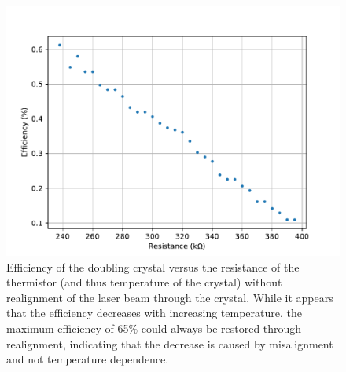 \begin{figure}[h!]
  \centering
  \includegraphics[width = .8\textwidth]{Images/efficiency.pdf}
  \caption{Efficiency of the doubling crystal versus the resistance of the thermistor (and thus temperature of the crystal) without realignment of the laser beam through the crystal. While it appears that the efficiency decreases with increasing temperature, the maximum efficiency of 65\% could always be restored through realignment, indicating that the decrease is caused by misalignment and not temperature dependence.}
  \label{fig:crystaleff}
\end{figure}
